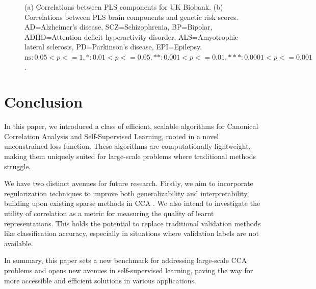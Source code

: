 \begin{figure}
\begin{subfigure}[b]{0.72\textwidth}
        \caption{}
        \label{fig:genetic_risk}
    \end{subfigure}
    \caption{(a) Correlations between PLS components for UK Biobank. (b) Correlations between PLS brain components and genetic risk scores. AD=Alzheimer's disease, SCZ=Schizophrenia, BP=Bipolar, ADHD=Attention deficit hyperactivity disorder, ALS=Amyotrophic lateral sclerosis, PD=Parkinson's disease, EPI=Epilepsy. $\text{ns}: 0.05< p <= 1, \ast: 0.01< p <=0.05, \ast\ast: 0.001< p <= 0.01, \ast\ast\ast: 0.0001< p <= 0.001$.}
\end{figure}

\section{Conclusion}

In this paper, we introduced a class of efficient, scalable algorithms for Canonical Correlation Analysis and Self-Supervised Learning, rooted in a novel unconstrained loss function. These algorithms are computationally lightweight, making them uniquely suited for large-scale problems where traditional methods struggle.

We have two distinct avenues for future research. Firstly, we aim to incorporate regularization techniques to improve both generalizability and interpretability, building upon existing sparse methods in CCA \citep{witten2009extensions}. We also intend to investigate the utility of correlation as a metric for measuring the quality of learnt representations. This holds the potential to replace traditional validation methods like classification accuracy, especially in situations where validation labels are not available.

In summary, this paper sets a new benchmark for addressing large-scale CCA problems and opens new avenues in self-supervised learning, paving the way for more accessible and efficient solutions in various applications.